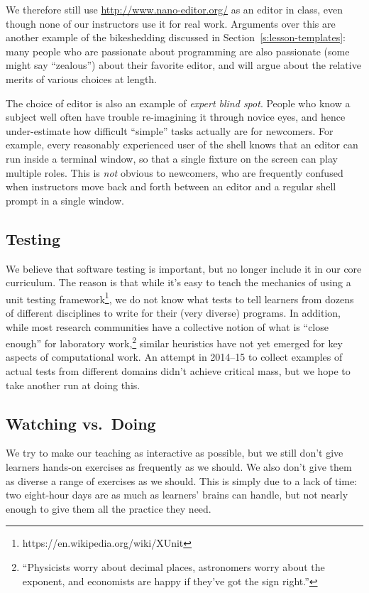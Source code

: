\documentclass[10pt,a4paper,twocolumn]{article}
\begin{document}
We therefore still use \href{Nano}{http://www.nano-editor.org/} as an
editor in class, even though none of our instructors use it for real
work.  Arguments over this are another example of the bikeshedding
discussed in Section~\ref{s:lesson-templates}: many people who are
passionate about programming are also passionate (some might say
``zealous'') about their favorite editor, and will argue about the
relative merits of various choices at length.

The choice of editor is also an example of \emph{expert blind spot}.
People who know a subject well often have trouble re-imagining it
through novice eyes, and hence under-estimate how difficult ``simple''
tasks actually are for newcomers.  For example, every reasonably
experienced user of the shell knows that an editor can run inside a
terminal window, so that a single fixture on the screen can play
multiple roles.  This is \emph{not} obvious to newcomers, who are
frequently confused when instructors move back and forth between an
editor and a regular shell prompt in a single window.

\subsection{Testing}

We believe that software testing is important, but no longer include
it in our core curriculum.  The reason is that while it's easy to
teach the mechanics of using a unit testing
framework\footnote{https://en.wikipedia.org/wiki/XUnit}, we do not
know what tests to tell learners from dozens of different disciplines
to write for their (very diverse) programs.  In addition, while most
research communities have a collective notion of what is ``close
enough'' for laboratory work,\footnote{``Physicists worry about
  decimal places, astronomers worry about the exponent, and economists
  are happy if they've got the sign right.''} similar heuristics have
not yet emerged for key aspects of computational work.  An attempt in
2014--15 to collect examples of actual tests from different domains
didn't achieve critical mass, but we hope to take another run at doing
this.

\subsection{Watching vs.\ Doing}

We try to make our teaching as interactive as possible, but we still
don't give learners hands-on exercises as frequently as we should.  We
also don't give them as diverse a range of exercises as we should.
This is simply due to a lack of time: two eight-hour days are as much
as learners' brains can handle, but not nearly enough to give them all
the practice they need.
\end{document}
